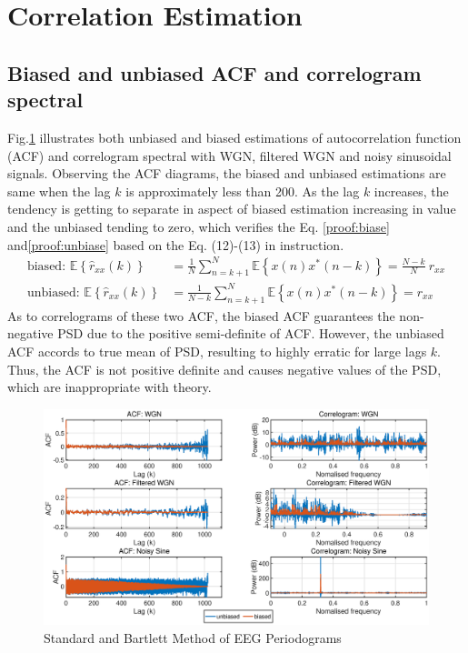 \section{Correlation Estimation}
\subsection{Biased and unbiased ACF and correlogram spectral}
Fig.\ref{fig:1_3_a} illustrates both unbiased and biased estimations of autocorrelation function (ACF) and correlogram spectral with WGN, filtered WGN and noisy sinusoidal signals.  Observing the ACF diagrams, the biased and unbiased estimations are same when the lag $k$ is approximately less than 200. As the lag $k$ increases, the tendency is getting to separate in aspect of biased estimation increasing in value and the unbiased tending to zero, which verifies the Eq. \ref{proof:biase} and\ref{proof:unbiase} based on the Eq. (12)-(13) in instruction.
\begin{align}
\text{biased: } \mathbb{E}\left\{\hat r_{xx}(k)\right\} & =\frac{1}{N} \sum_{n=k+1}^{N} \mathbb{E} \left\{x(n)x^*(n-k) \right \} = \frac{N-k}{N}\ r_{xx}\label{proof:biase}\\
\text{unbiased: }\mathbb{E}\left\{\hat r_{xx}(k)\right\} & =\frac{1}{N-k} \sum_{n=k+1}^{N} \mathbb{E} \left\{x(n)x^*(n-k) \right \} = r_{xx}\label{proof:unbiase}
\end{align}
As to  correlograms of these two ACF, the biased ACF guarantees the non-negative PSD due to the positive semi-definite of ACF. However, the unbiased ACF accords to true mean of PSD, resulting to highly erratic for large lags $k$. Thus, the ACF is not positive definite and causes negative values of the PSD, which are inappropriate with theory. 
\begin{figure}[htb]
\centering
\includegraphics[width=\textwidth]{fig/13/13a.eps}
\caption{Standard and Bartlett Method of EEG Periodograms}
\label{fig:1_3_a}
\end{figure}\\
